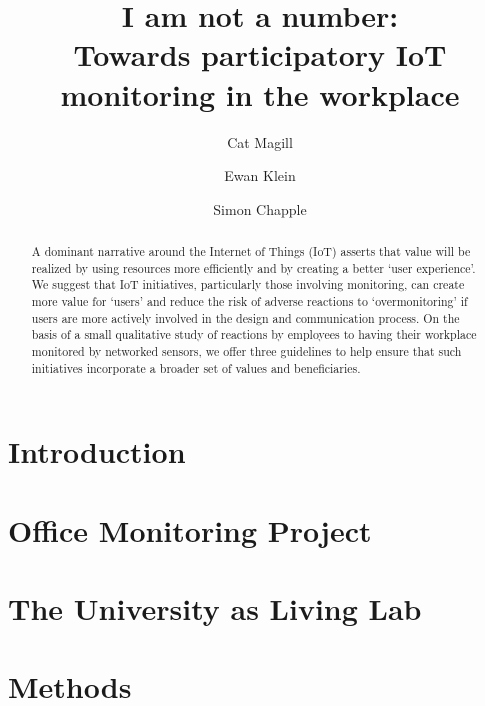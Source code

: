 \documentclass[10pt,twocolumn]{article}
\begin{document}
\title{\bfseries\LARGE  I am not a number:\\
Towards participatory IoT monitoring in the workplace}

\author[*]{Cat Magill}
\author[*]{Ewan Klein}
\author[$\dagger$]{Simon Chapple}
\date{}

\maketitle

\begin{abstract}
A dominant narrative around the Internet of Things (IoT) asserts that
value will be realized by using resources more efficiently and by
creating a better ‘user experience’.  We suggest that IoT initiatives,
particularly those involving monitoring, can create more value for
`users' and reduce the risk of adverse reactions to `overmonitoring'
if users are more actively involved in the design and communication
process.  On the basis of a small qualitative study of reactions by
employees to having their workplace monitored by networked sensors, we
offer three guidelines to help ensure that such initiatives
incorporate a broader set of values and beneficiaries. 
\end{abstract}



\section{Introduction}
\label{sec:introduction}



\section{Office Monitoring Project}
\label{sec:pilot}



\section{The University as Living Lab}
\label{sec:university-as-ll}



\section{Methods}
\label{sec:methods}
\end{document}
